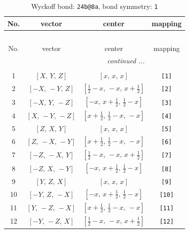 \documentclass[fleqn,8pt]{jsarticle}
\begin{document}
\begin{longtable}{cccc}
\caption{Wyckoff bond: {\tt 24b@8a}, bond symmetry: {\tt 1}}
 \\
 \hline \hline
No. & vector & center & mapping \\ \hline \endfirsthead

\multicolumn{3}{l}{\tablename\ \thetable{}} \\
 \hline \hline
No. & vector & center & mapping \\ \hline \endhead

 \hline \hline
\multicolumn{3}{r}{\footnotesize\it continued ...} \\ \endfoot

 \hline \hline
\multicolumn{3}{r}{} \\ \endlastfoot

1 & $\left[ X,\, Y,\, Z \right]$ & $\left[ x,\, x,\, x \right]$ & {\tt [1]} \\ \hline
2 & $\left[ - X,\, - Y,\, Z \right]$ & $\left[ \frac{1}{2} - x,\, - x,\, x + \frac{1}{2} \right]$ & {\tt [2]} \\ \hline
3 & $\left[ - X,\, Y,\, - Z \right]$ & $\left[ - x,\, x + \frac{1}{2},\, \frac{1}{2} - x \right]$ & {\tt [3]} \\ \hline
4 & $\left[ X,\, - Y,\, - Z \right]$ & $\left[ x + \frac{1}{2},\, \frac{1}{2} - x,\, - x \right]$ & {\tt [4]} \\ \hline
5 & $\left[ Z,\, X,\, Y \right]$ & $\left[ x,\, x,\, x \right]$ & {\tt [5]} \\ \hline
6 & $\left[ Z,\, - X,\, - Y \right]$ & $\left[ x + \frac{1}{2},\, \frac{1}{2} - x,\, - x \right]$ & {\tt [6]} \\ \hline
7 & $\left[ - Z,\, - X,\, Y \right]$ & $\left[ \frac{1}{2} - x,\, - x,\, x + \frac{1}{2} \right]$ & {\tt [7]} \\ \hline
8 & $\left[ - Z,\, X,\, - Y \right]$ & $\left[ - x,\, x + \frac{1}{2},\, \frac{1}{2} - x \right]$ & {\tt [8]} \\ \hline
9 & $\left[ Y,\, Z,\, X \right]$ & $\left[ x,\, x,\, x \right]$ & {\tt [9]} \\ \hline
10 & $\left[ - Y,\, Z,\, - X \right]$ & $\left[ - x,\, x + \frac{1}{2},\, \frac{1}{2} - x \right]$ & {\tt [10]} \\ \hline
11 & $\left[ Y,\, - Z,\, - X \right]$ & $\left[ x + \frac{1}{2},\, \frac{1}{2} - x,\, - x \right]$ & {\tt [11]} \\ \hline
12 & $\left[ - Y,\, - Z,\, X \right]$ & $\left[ \frac{1}{2} - x,\, - x,\, x + \frac{1}{2} \right]$ & {\tt [12]} \\
\end{longtable}
\end{document}
